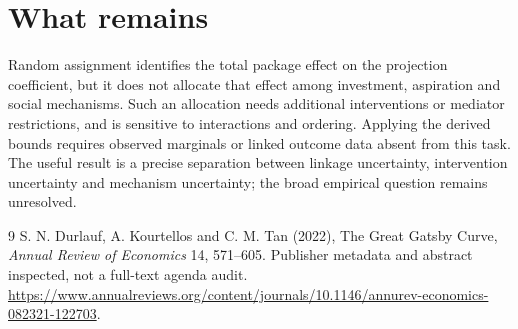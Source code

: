 \documentclass[11pt]{article}
\begin{document}
\section*{What remains}
Random assignment identifies the total package effect on the projection coefficient, but it does not allocate that effect among investment, aspiration and social mechanisms. Such an allocation needs additional interventions or mediator restrictions, and is sensitive to interactions and ordering. Applying the derived bounds requires observed marginals or linked outcome data absent from this task. The useful result is a precise separation between linkage uncertainty, intervention uncertainty and mechanism uncertainty; the broad empirical question remains unresolved.
\begin{thebibliography}{9}
 S. N. Durlauf, A. Kourtellos and C. M. Tan (2022), The Great Gatsby Curve, \emph{Annual Review of Economics} 14, 571--605. Publisher metadata and abstract inspected, not a full-text agenda audit. \url{https://www.annualreviews.org/content/journals/10.1146/annurev-economics-082321-122703}.
\end{thebibliography}
\end{document}
